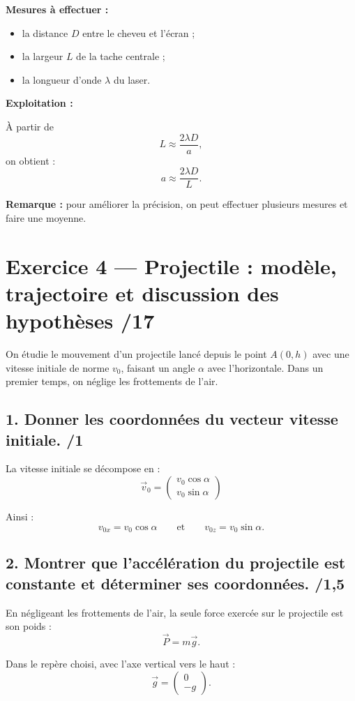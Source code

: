 \documentclass[11pt,a4paper]{article}
\begin{document}
\textbf{Mesures à effectuer :}
\begin{itemize}
    \item la distance \(D\) entre le cheveu et l'écran ;
    \item la largeur \(L\) de la tache centrale ;
    \item la longueur d'onde \(\lambda\) du laser.
\end{itemize}

\textbf{Exploitation :}

À partir de
\[
L \approx \frac{2\lambda D}{a},
\]
on obtient :
\[
\boxed{a \approx \frac{2\lambda D}{L}}.
\]

\textbf{Remarque :} pour améliorer la précision, on peut effectuer plusieurs mesures et faire une moyenne.

\newpage
\section*{Exercice 4 --- Projectile : modèle, trajectoire et discussion des hypothèses \hfill /17}

On étudie le mouvement d'un projectile lancé depuis le point \(A(0,h)\) avec une vitesse initiale de norme \(v_0\), faisant un angle \(\alpha\) avec l'horizontale.  
Dans un premier temps, on néglige les frottements de l'air.

\subsection*{1. Donner les coordonnées du vecteur vitesse initiale. \hfill /1}

La vitesse initiale se décompose en :
\[
\boxed{\vec v_0=
\begin{pmatrix}
v_0\cos\alpha\\
v_0\sin\alpha
\end{pmatrix}}
\]

Ainsi :
\[
v_{0x}=v_0\cos\alpha
\qquad \text{et} \qquad
v_{0z}=v_0\sin\alpha.
\]

\subsection*{2. Montrer que l'accélération du projectile est constante et déterminer ses coordonnées. \hfill /1{,}5}

En négligeant les frottements de l'air, la seule force exercée sur le projectile est son poids :
\[
\vec P = m\vec g.
\]

Dans le repère choisi, avec l'axe vertical vers le haut :
\[
\vec g=
\begin{pmatrix}
0\\
-g
\end{pmatrix}.
\]
\end{document}
